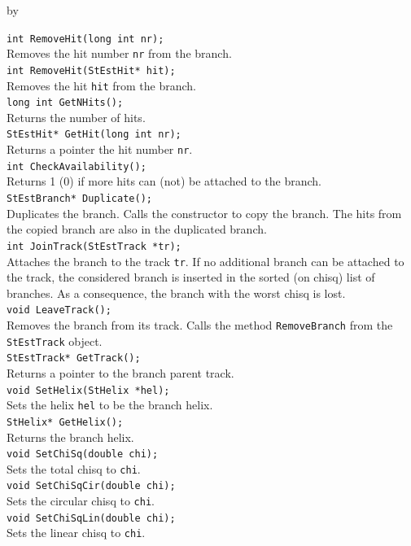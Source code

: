 \documentclass[twoside]{article}
\newcommand{\entrylabel}[1]{\mbox{\textbf{{#1}}}\hfil}%
\newenvironment{entry}
{\begin{list}{}%
    {\renewcommand{\makelabel}{\entrylabel}%
     \setlength{\labelwidth}{90pt}%
     \setlength{\leftmargin}{\labelwidth}
     \advance\leftmargin by \labelsep%
      }%
    }%
  {\end{list}}
\newcommand{\Entrylabel}[1]%
{\raisebox{0pt}[1ex][0pt]{\makebox[\labelwidth][l]%
    {\parbox[t]{\labelwidth}{\hspace{0pt}\textbf{{#1}}}}}}
\newenvironment{Entry}%
{\renewcommand{\entrylabel}{\Entrylabel}\begin{entry}}%
  {\end{entry}}
\begin{document}
\begin{Entry}
	\verb+int RemoveHit(long int nr);+\\
	Removes the hit number \verb+nr+ from the branch.\\
	\verb+int RemoveHit(StEstHit* hit);+\\
	Removes the hit \verb+hit+ from the branch.\\
	\verb+long int GetNHits();+\\
	Returns the number of hits.\\
	\verb+StEstHit* GetHit(long int nr);+\\
	Returns a pointer the hit number \verb+nr+.\\
	\verb+int CheckAvailability();+\\
	Returns 1 (0) if more hits can (not) be attached to the branch.\\
	\verb+StEstBranch* Duplicate();+\\
	Duplicates the branch. Calls the constructor to copy the branch. The hits from the copied branch are also in the duplicated branch.\\
	\verb+int JoinTrack(StEstTrack *tr);+\\
	Attaches the branch to the track \verb+tr+. If no additional branch can be attached to the track, the considered branch is inserted in the sorted (on chisq) list of branches. As a consequence, the branch with the worst chisq is lost. \\
	\verb+void LeaveTrack();+\\
	Removes the branch from its track. Calls the method \verb+RemoveBranch+ from the \verb+StEstTrack+ object.\\ 
	\verb+StEstTrack* GetTrack();+\\
	Returns a pointer to the branch parent track.\\
	\verb+void SetHelix(StHelix *hel);+\\
	Sets the helix \verb+hel+ to be the branch helix.\\
	\verb+StHelix* GetHelix();+\\
	Returns the branch helix.\\
	\verb+void SetChiSq(double chi);+\\
	Sets the total chisq to \verb+chi+.\\
	\verb+void SetChiSqCir(double chi);+\\
	Sets the circular chisq to \verb+chi+.\\
	\verb+void SetChiSqLin(double chi);+\\
	Sets the linear chisq to \verb+chi+.\\

\end{Entry}
\end{document}
